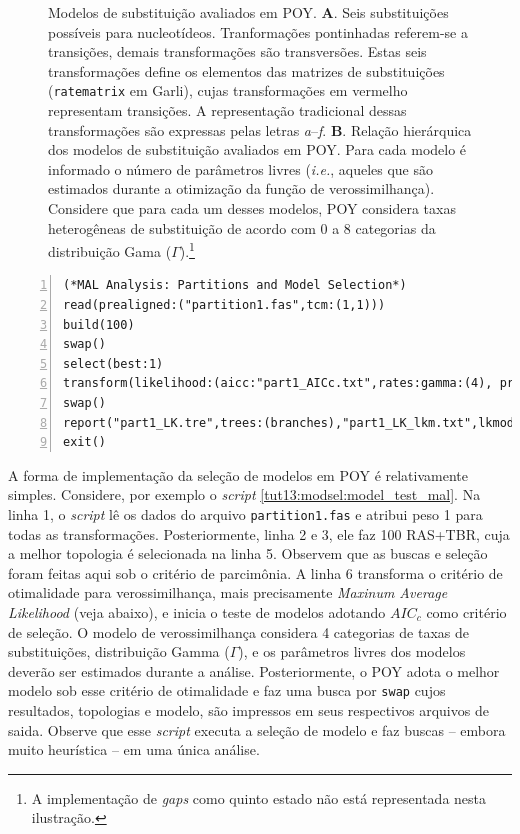 \begin{refsection}
\begin{figure}[h!]
    {\caption[Modelos de substituição avaliados em POY]{Modelos de substituição avaliados em POY. \textbf{A}. Seis substituições possíveis para nucleotídeos. Tranformações pontinhadas referem-se a transições, demais transformações são transversões. Estas seis transformações define os elementos das matrizes de substituições (\texttt{ratematrix} em Garli), cujas transformações em vermelho representam transições. A representação tradicional dessas transformações são expressas pelas letras \textit{a}--\textit{f}. \textbf{B}. Relação hierárquica dos modelos de substituição avaliados em POY. Para cada modelo é informado o número de parâmetros livres (\textit{i.e.}, aqueles que são estimados durante a otimização da função de verossimilhança). Considere que para cada um desses modelos, POY considera taxas heterogêneas de substituição de acordo com 0 a 8 categorias da distribuição Gama ($\Gamma$).\footnote{A implementação de \textit{gaps} como quinto estado não está representada nesta ilustração.}}\label{tut13:fig:models}}
  \end{figure}

\scriptsize
\begin{lstlisting}[caption={ \texttt{model\_test\_part1.poy}.},label=tut13:modsel:model_test_mal, numbers=left, numberblanklines=false]
(*MAL Analysis: Partitions and Model Selection*)
read(prealigned:("partition1.fas",tcm:(1,1)))
build(100)
swap()
select(best:1)
transform(likelihood:(aicc:"part1_AICc.txt",rates:gamma:(4), priors: estimate,mal))
swap()
report("part1_LK.tre",trees:(branches),"part1_LK_lkm.txt",lkmodel)
exit()

\end{lstlisting}
\normalsize

A forma de implementação da seleção de modelos em POY é relativamente simples. Considere, por exemplo o \textit{script} \ref{tut13:modsel:model_test_mal}. Na linha 1, o \textit{script} lê os dados do arquivo \texttt{partition1.fas} e atribui peso 1 para todas as transformações. Posteriormente, linha 2 e 3, ele faz 100 RAS+TBR, cuja a melhor topologia é selecionada na linha 5. Observem que as buscas e seleção foram feitas aqui sob o critério de parcimônia. A linha 6 transforma o critério de otimalidade para verossimilhança, mais precisamente \textit{Maxinum Average Likelihood} (veja abaixo), e inicia o teste de modelos adotando $AIC_{c}$ como critério de seleção. O modelo de verossimilhança considera 4 categorias de taxas de substituições, distribuição Gamma ($\Gamma$), e os parâmetros livres dos modelos deverão ser estimados durante a análise. Posteriormente, o POY adota o melhor modelo sob esse critério de otimalidade e faz uma busca por \texttt{swap} cujos resultados, topologias e modelo, são impressos em seus respectivos arquivos de saida. Observe que esse \textit{script} executa a seleção de modelo e faz buscas -- embora muito heurística -- em uma única análise.


\end{refsection}

